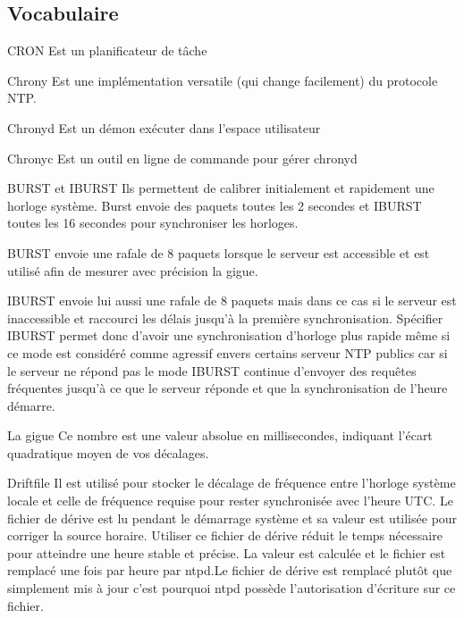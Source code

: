 \documentclass[a4paper]{article}
\begin{document}
\begin{adjustwidth}{-2cm}{-2cm}
\newpage
\section{Vocabulaire}
CRON \newline
Est un planificateur de tâche\newline

Chrony\newline
Est une implémentation versatile (qui change facilement) du protocole NTP.\newline

Chronyd\newline
Est un démon exécuter dans l’espace utilisateur\newline

Chronyc\newline
Est un outil en ligne de commande pour gérer chronyd\newline

BURST et IBURST\newline
Ils permettent de calibrer initialement et rapidement une horloge système.\newline
Burst envoie des paquets toutes les 2 secondes et IBURST toutes les 16 secondes pour synchroniser les horloges.\newline

BURST envoie une rafale de 8 paquets lorsque le serveur est accessible et est utilisé afin de mesurer avec précision la gigue.\newline

IBURST envoie lui aussi une rafale de 8 paquets mais dans ce cas si le serveur est inaccessible et raccourci les délais jusqu'à la première synchronisation. Spécifier IBURST permet donc d’avoir une synchronisation d’horloge plus rapide même si ce mode est considéré comme agressif envers certains serveur NTP publics car si le serveur ne répond pas le mode IBURST continue d'envoyer des requêtes fréquentes jusqu'à ce que le serveur réponde et que la synchronisation de l’heure démarre.\newline

La gigue\newline
Ce nombre est une valeur absolue en millisecondes, indiquant l'écart quadratique moyen de vos décalages.\newline

Driftfile\newline
Il est utilisé pour stocker le décalage de fréquence entre l'horloge système locale et celle de  fréquence requise pour rester synchronisée avec l'heure UTC. Le fichier de dérive est lu pendant le démarrage système et sa valeur est utilisée pour corriger la source horaire.  Utiliser ce fichier de dérive réduit le temps nécessaire pour atteindre une heure stable et précise. La valeur est calculée et le fichier est remplacé une fois par heure par ntpd.Le fichier de dérive est remplacé plutôt que simplement mis à jour c’est pourquoi ntpd possède l’autorisation d’écriture sur ce fichier.
\newline


\end{adjustwidth}
\end{document}
